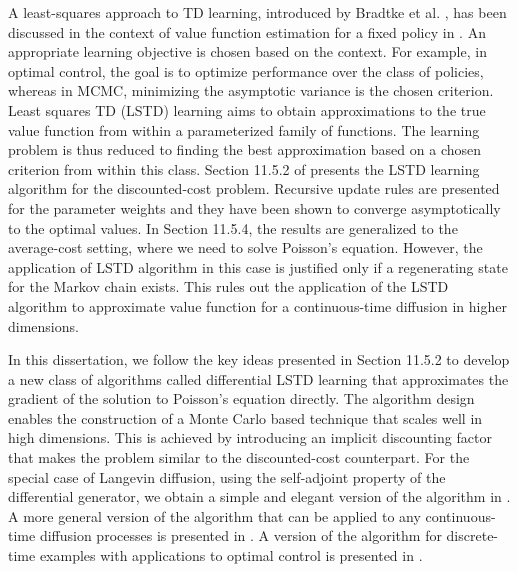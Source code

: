 A least-squares approach to TD learning, introduced by Bradtke et al. \cite{brabar96},  has been discussed in the context of value function estimation for a fixed policy in \cite{ctcn}. An appropriate learning objective is chosen based on the context. For example, in optimal control, the goal is to optimize performance over the class of policies, whereas in MCMC, minimizing the asymptotic variance is the chosen criterion. Least squares TD (LSTD) learning aims to obtain approximations to the true value function from within a parameterized family of functions. The learning problem is thus reduced to finding the best approximation based on a chosen criterion from within this class. Section 11.5.2 of \cite{ctcn} presents the LSTD learning algorithm for the discounted-cost problem. Recursive update rules are presented for the parameter weights and they have been shown to converge asymptotically to the optimal values. In Section 11.5.4, the results are generalized to the average-cost setting, where we need to solve Poisson's equation. However, the application of LSTD algorithm in this case is justified only if a regenerating state for the Markov chain exists. This rules out the application of the LSTD algorithm to approximate value function for a continuous-time diffusion in higher dimensions.

In this dissertation, we follow the key ideas presented in Section 11.5.2 to develop a new class of algorithms called differential LSTD learning that approximates the gradient of the solution to Poisson's equation directly.  The algorithm design enables the construction of a Monte Carlo based technique that scales well in high dimensions. This is achieved by introducing an implicit discounting factor that makes the problem similar to the discounted-cost counterpart. For the special case of Langevin diffusion, using the self-adjoint property of the differential generator, we obtain a simple and elegant version of the algorithm in .  A more general version of the algorithm that can be applied to any continuous-time diffusion processes is presented in . 
A version of the algorithm for discrete-time examples with applications to optimal control is presented in \cite{devmey16arXiv}.
 
